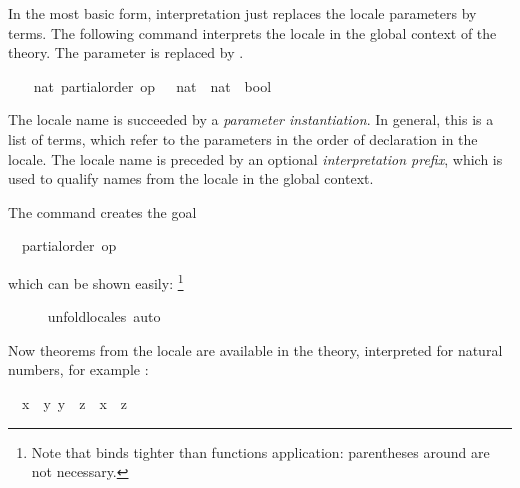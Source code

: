 \begin{isabellebody}
\begin{isamarkuptext}
  In the most basic form, interpretation just replaces the locale
  parameters by terms.  The following command interprets the locale
   in the global context of the theory.  The
  parameter  is replaced by .%
\end{isamarkuptext}%
\isamarkuptrue%
%
\isadelimvisible
\ \ %
\endisadelimvisible
%
\isatagvisible
{}\isamarkupfalse%
\ nat{\isacharcolon}\ partial{\isacharunderscore}order\ {\isacharbrackleft}{\isachardoublequoteopen}op\ {\isasymle}\ {\isacharcolon}{\isacharcolon}\ nat\ {\isasymRightarrow}\ nat\ {\isasymRightarrow}\ bool{\isachardoublequoteclose}{\isacharbrackright}%
\begin{isamarkuptxt}%
The locale name is succeeded by a \emph{parameter
  instantiation}.  In general, this is a list of terms, which refer to
  the parameters in the order of declaration in the locale.  The
  locale name is preceded by an optional \emph{interpretation prefix},
  which is used to qualify names from the locale in the global
  context.

  The command creates the goal \begin{isabelle}%
\ {}{\isachardot}\ partial{\isacharunderscore}order\ op\ {\isasymle}%
\end{isabelle} which can be shown
  easily:%
\footnote{Note that  binds tighter than functions
  application: parentheses around  are not necessary.}%
\end{isamarkuptxt}%
\isamarkuptrue%
\ \ \ \ \isamarkupfalse%
\ unfold{\isacharunderscore}locales\ auto%
\endisatagvisible
{\isafoldvisible}%
%
\isadelimvisible
%
\endisadelimvisible
%
\begin{isamarkuptext}%
Now theorems from the locale are available in the theory,
  interpreted for natural numbers, for example : \begin{isabelle}%
\ \ {\isasymlbrakk}{\isacharquery}x\ {\isasymle}\ {\isacharquery}y{\isacharsemicolon}\ {\isacharquery}y\ {\isasymle}\ {\isacharquery}z{\isasymrbrakk}\ {\isasymLongrightarrow}\ {\isacharquery}x\ {\isasymle}\ {\isacharquery}z%
\end{isabelle}


\end{isamarkuptext}
\end{isabellebody}

